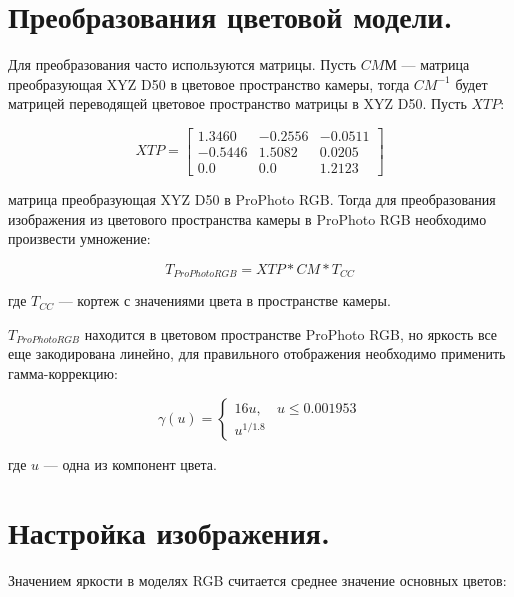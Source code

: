 
\section{Преобразования цветовой модели.}

Для преобразования часто используются матрицы. Пусть $CMМ$ --- матрица преобразующая XYZ D50 в цветовое пространство камеры, тогда $CM^{-1}$ будет матрицей переводящей цветовое пространство матрицы в XYZ D50. Пусть $XTP$:

\begin{equation}
	\label{XTP}
	XTP = \begin{bmatrix}
			1.3460 & -0.2556 & -0.0511 \\
			-0.5446 & 1.5082 & 0.0205 \\
			0.0 & 0.0 & 1.2123 
		\end{bmatrix}
\end{equation}

матрица преобразующая XYZ D50 в ProPhoto RGB. Тогда для преобразования изображения из цветового пространства камеры в ProPhoto RGB необходимо произвести умножение:

\begin{equation}
	\label{tosrgb}
	T_{ProPhoto RGB} = XTP * CM * T_{CC}
\end{equation}

где $T_{CC}$ --- кортеж с значениями цвета в пространстве камеры.

$T_{ProPhoto RGB}$ находится в цветовом пространстве ProPhoto RGB, но яркость все еще закодирована линейно, для правильного отображения необходимо применить гамма-коррекцию:

\begin{equation}
	\label{gamma}
	\gamma(u) = 
	\begin{cases}
		16u, & u \le 0.001953 \\
		u^{1/1.8}
	\end{cases}
\end{equation}

где $u$ --- одна из компонент цвета. \cite{ppspec}

\section{Настройка изображения.}

Значением яркости в моделях RGB считается среднее значение основных цветов:

